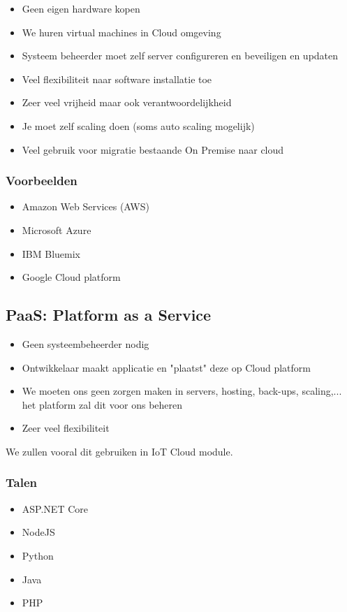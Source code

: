 \documentclass{article}
\begin{document}
\begin{itemize}
    \item Geen eigen hardware kopen
    \item We huren virtual machines in Cloud omgeving
    \item Systeem beheerder moet zelf server configureren en beveiligen en updaten
    \item Veel flexibiliteit naar software installatie toe
    \item Zeer veel vrijheid maar ook verantwoordelijkheid
    \item Je moet zelf scaling doen (soms auto scaling mogelijk)
    \item Veel gebruik voor migratie bestaande On Premise naar cloud
\end{itemize}

\subsubsection{Voorbeelden}
\begin{itemize}
    \item Amazon Web Services (AWS)
    \item Microsoft Azure
    \item IBM Bluemix
    \item Google Cloud platform
\end{itemize}

\subsection{PaaS: Platform as a Service}

\begin{itemize}
    \item Geen systeembeheerder nodig
    \item Ontwikkelaar maakt applicatie en "plaatst" deze op Cloud platform
    \item We moeten ons geen zorgen maken in servers, hosting, back-ups, scaling,... het platform zal dit voor ons beheren
    \item Zeer veel flexibiliteit
\end{itemize}

We zullen vooral dit gebruiken in IoT Cloud module.

\subsubsection{Talen}
\begin{itemize}
    \item ASP.NET Core
    \item NodeJS
    \item Python
    \item Java
    \item PHP
\end{itemize}
\end{document}
